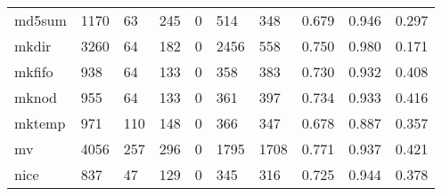 \begin{longtable}{lp{1.3cm}p{1.3cm}p{1.3cm}p{1.3cm}p{1.3cm}p{1.3cm}p{1.3cm}p{1.3cm}p{1.3cm}}
md5sum    &                   1170 &                                 63 &                               245 &                                0 &                               514 &                             348 &                                   0.679 &                                  0.946 &                                0.297 \\
mkdir     &                   3260 &                                 64 &                               182 &                                0 &                              2456 &                             558 &                                   0.750 &                                  0.980 &                                0.171 \\
mkfifo    &                    938 &                                 64 &                               133 &                                0 &                               358 &                             383 &                                   0.730 &                                  0.932 &                                0.408 \\
mknod     &                    955 &                                 64 &                               133 &                                0 &                               361 &                             397 &                                   0.734 &                                  0.933 &                                0.416 \\
mktemp    &                    971 &                                110 &                               148 &                                0 &                               366 &                             347 &                                   0.678 &                                  0.887 &                                0.357 \\
mv        &                   4056 &                                257 &                               296 &                                0 &                              1795 &                            1708 &                                   0.771 &                                  0.937 &                                0.421 \\
nice      &                    837 &                                 47 &                               129 &                                0 &                               345 &                             316 &                                   0.725 &                                  0.944 &                                0.378 \\

\end{longtable}
